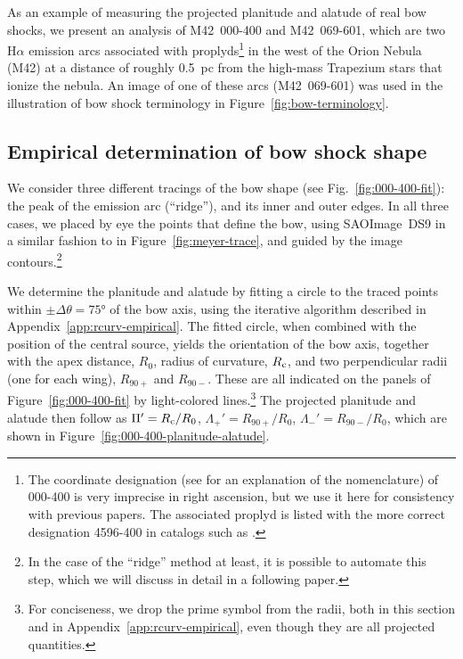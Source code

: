 As an example of measuring the projected planitude and alatude of real
bow shocks, we present an analysis of M42~000-400 and M42~069-601,
which are two H\(\alpha\) emission arcs \citep{Bally:2000a,
  Gutierrez-Soto:2015a} associated with proplyds\footnote{%
  The coordinate designation (see \citealp{ODell:1994a} for an
  explanation of the nomenclature) of 000-400 is very imprecise in
  right ascension, but we use it here for consistency with previous
  papers. The associated proplyd is listed with the more correct
  designation 4596-400 in catalogs such as \citet{Ricci:2008a}.  } %
in the west of the Orion Nebula (M42) at a distance of roughly
\SI{0.5}{pc} from the high-mass Trapezium stars that ionize the
nebula.  An image of one of these arcs (M42~069-601) was used in the
illustration of bow shock terminology in
Figure~\ref{fig:bow-terminology}.


\subsection{Empirical determination of bow shock shape}
\label{sec:empir-determ-bow}

We consider three different tracings of the bow shape (see
Fig.~\ref{fig:000-400-fit}): the peak of the emission arc (``ridge''),
and its inner and outer edges.  In all three cases, we placed by eye
the points that define the bow, using SAOImage~DS9 \citep{Joye:2003a}
in a similar fashion to in Figure~\ref{fig:meyer-trace}, and guided by
the image contours.\footnote{%
  In the case of the ``ridge'' method at least, it is possible to
  automate this step, which we will discuss in detail in a following
  paper. } %

We determine the planitude and alatude by fitting a circle to the
traced points within \(\pm \Delta\theta = \ang{75}\) of the bow axis, using the
iterative algorithm described in Appendix~\ref{app:rcurv-empirical}.
The fitted circle, when combined with the position of the central
source, yields the orientation of the bow axis, together with the apex
distance, \(R_0\), radius of curvature, \(R_{\mathrm{c}}\), and two
perpendicular radii (one for each wing), \(R_{90+}\) and \(R_{90-}\).
These are all indicated on the panels of Figure~\ref{fig:000-400-fit}
by light-colored lines.\footnote{%
  For conciseness, we drop the prime symbol from the radii, both in
  this section and in Appendix~\ref{app:rcurv-empirical}, even though
  they are all projected quantities.} %
The projected planitude and alatude then follow as
\(\Pi' = R_{\mathrm{c}}/R_0\), \(\Lambda_+' = R_{90+}/R_0\),
\(\Lambda_-' = R_{90-}/R_0\), which are shown in
Figure~\ref{fig:000-400-planitude-alatude}.


